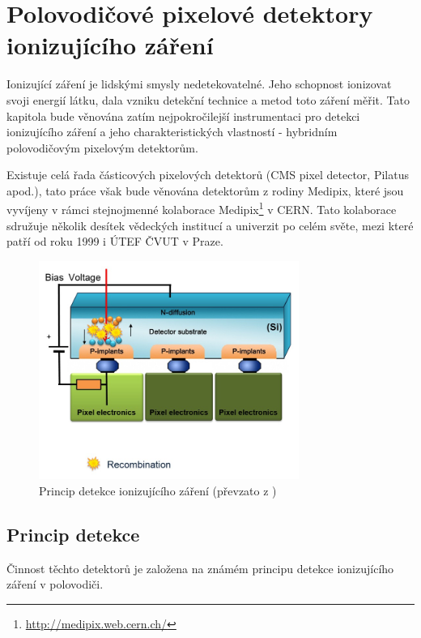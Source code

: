 

\chapter{Polovodičové pixelové detektory ionizujícího záření}\label{det}
Ionizující záření je lidskými smysly nedetekovatelné. Jeho schopnost ionizovat svoji energií látku, dala vzniku detekční technice a metod toto záření měřit. Tato kapitola bude věnována zatím nejpokročilejší instrumentaci pro detekci ionizujícího záření a jeho charakteristických vlastností - hybridním polovodičovým pixelovým detektorům.

Existuje celá řada částicových pixelových detektorů (CMS pixel detector, Pilatus apod.), tato práce však bude věnována detektorům z rodiny Medipix, které jsou vyvíjeny v rámci stejnojmenné kolaborace Medipix\footnote{\url{http://medipix.web.cern.ch/}} v CERN. Tato kolaborace sdružuje několik desítek vědeckých institucí a univerzit po celém světe, mezi které patří od roku 1999 i ÚTEF ČVUT v Praze.

\begin{figure}[th!]
	\begin{center}
		\includegraphics[width=8.5cm]{figures/det_recombination.png}
		\caption{Princip detekce ionizujícího záření (převzato z \cite{PlatkevicDisertace})}
		\label{fig:det:recomb}
	\end{center}
\end{figure}

\section{Princip detekce}
Činnost těchto detektorů je založena na známém principu detekce ionizujícího záření v polovodiči. 

